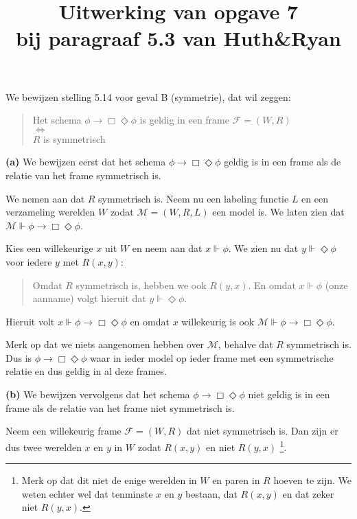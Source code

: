 \documentclass[a4paper,11pt]{article}
\title{Uitwerking van opgave 7\\
\normalsize{bij paragraaf 5.3 van Huth\&Ryan}}
\date{}
\begin{document}
\maketitle


We bewijzen stelling 5.14 voor geval B (symmetrie), dat wil zeggen:

\begin{quote}
  Het schema $\phi \rightarrow \Box \Diamond \phi$ is geldig in een frame
  $\mathcal{F} = (W, R)$ \\
  $\Longleftrightarrow$ \\
  $R$ is symmetrisch
\end{quote}


\begin{description}

\item{\bf (a)}
We bewijzen eerst dat het schema $\phi \rightarrow \Box \Diamond \phi$ geldig
is in een frame als de relatie van het frame symmetrisch is.

We nemen aan dat $R$ symmetrisch is. Neem nu een labeling functie $L$ en een
verzameling werelden $W$ zodat $\mathcal{M} = (W, R, L)$ een model is. We
laten zien dat $\mathcal{M} \Vdash \phi \rightarrow \Box \Diamond \phi$.

Kies een willekeurige $x$ uit $W$ en neem aan dat $x \Vdash \phi$. We zien nu
dat $y \Vdash \Diamond \phi$ voor iedere $y$ met $R(x, y)$:
\begin{quote}
  Omdat $R$ symmetrisch is, hebben we ook $R(y, x)$. En omdat $x \Vdash \phi$
  (onze aanname) volgt hieruit dat $y \Vdash \Diamond \phi$.
\end{quote}
Hieruit volt $x \Vdash \phi \rightarrow \Box \Diamond \phi$ en omdat $x$
willekeurig is ook $\mathcal{M} \Vdash \phi \rightarrow \Box \Diamond \phi$.

Merk op dat we niets aangenomen hebben over $\mathcal{M}$, behalve dat $R$
symmetrisch is. Dus is $\phi \rightarrow \Box \Diamond \phi$ waar in ieder
model op ieder frame met een symmetrische relatie en dus geldig in al deze
frames.

\item{\bf (b)}
We bewijzen vervolgens dat het schema $\phi \rightarrow \Box \Diamond \phi$
niet geldig is in een frame als de relatie van het frame niet symmetrisch is.

Neem een willekeurig frame $\mathcal{F} = (W, R)$ dat niet symmetrisch is. Dan
zijn er dus twee werelden $x$ en $y$ in $W$ zodat $R(x, y)$ en niet $R(y, x)$
\footnote{Merk op dat dit niet de enige werelden in $W$ en paren in $R$ hoeven
te zijn. We weten echter wel dat tenminste $x$ en $y$ bestaan, dat $R(x, y)$
en dat zeker niet $R(y, x)$.}.


\end{description}
\end{document}
